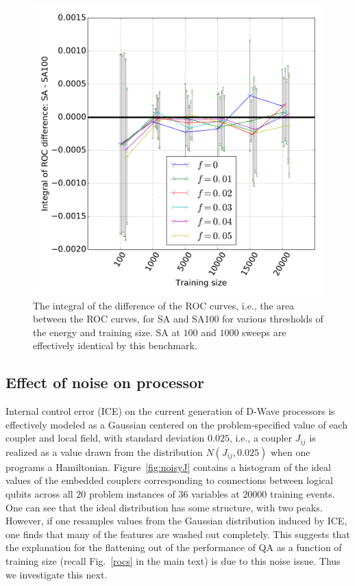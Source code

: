  \begin{figure}[hbb]
 \centering
  \includegraphics[width=0.7\columnwidth]{chapters/Higgs/SA--SA100_auc}
  \caption{The integral of the difference of the ROC curves, i.e., the area between the ROC curves, for SA and SA100 for various thresholds of the energy and training size. SA at $100$ and $1000$ sweeps are effectively identical by this benchmark.}
  \label{fig:SAmSA100droc}
\end{figure}


\subsection{Effect of noise on processor}
\label{app:ICE}
Internal control error (ICE) on the current generation of D-Wave processors is effectively modeled as a Gaussian centered on the problem-specified value of each coupler and local field, with standard deviation $0.025$, i.e., a coupler $J_{ij}$ is realized as a value drawn from the distribution $N(J_{ij},0.025)$ when one programs a Hamiltonian. Figure~\ref{fig:noisyJ} contains a histogram of the ideal values of the embedded couplers corresponding to connections between logical qubits across all $20$ problem instances of $36$ variables at 20000 training events. One can see that the ideal distribution has some structure, with two peaks. However, if one resamples values from the Gaussian distribution induced by ICE, one finds that many of the features are washed out completely. This suggests that the explanation for the flattening out of the performance of QA as a function of training size (recall Fig.~\ref{rocs} in the main text) is due to this noise issue. Thus we investigate this next.

